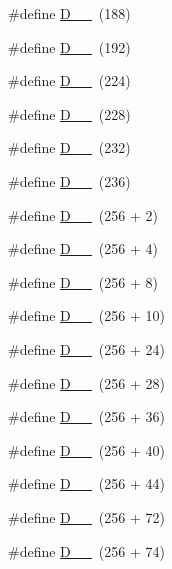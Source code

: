 \begin{DoxyCompactItemize}
\item 
\#define \hyperlink{group___d_r_i_v_e_r_s_gabe9d05e6c0b53d1452944c767ec4e39f}{D\+\_\+\_}~(188)
\item 
\#define \hyperlink{group___d_r_i_v_e_r_s_ga737381384143cf039503023e04037a26}{D\+\_\+\_}~(192)
\item 
\#define \hyperlink{group___d_r_i_v_e_r_s_gafd5baf97b37c848b12dec9b718d27188}{D\+\_\+\_}~(224)
\item 
\#define \hyperlink{group___d_r_i_v_e_r_s_ga87090eb84fc9a689a087e9f7e59cd4fb}{D\+\_\+\_}~(228)
\item 
\#define \hyperlink{group___d_r_i_v_e_r_s_gafd752a244bd3eb5e07f77712d9653197}{D\+\_\+\_}~(232)
\item 
\#define \hyperlink{group___d_r_i_v_e_r_s_ga9141d44a2f2636d23c001b5832118326}{D\+\_\+\_}~(236)
\item 
\#define \hyperlink{group___d_r_i_v_e_r_s_gab444dc9d9eaf98f46563cc87fcb965a4}{D\+\_\+\_}~(256 + 2)
\item 
\#define \hyperlink{group___d_r_i_v_e_r_s_ga83973bf9de6879524cca19f3332e707e}{D\+\_\+\_}~(256 + 4)
\item 
\#define \hyperlink{group___d_r_i_v_e_r_s_ga2f44fbe8696fcc34619d6e61916c22d0}{D\+\_\+\_}~(256 + 8)
\item 
\#define \hyperlink{group___d_r_i_v_e_r_s_ga6b208218857c2067078082e832148f61}{D\+\_\+\_}~(256 + 10)
\item 
\#define \hyperlink{group___d_r_i_v_e_r_s_gac84316958d525db0c89e1519e8af6637}{D\+\_\+\_}~(256 + 24)
\item 
\#define \hyperlink{group___d_r_i_v_e_r_s_ga2533cfdd19cb87a86667620a33a9d561}{D\+\_\+\_}~(256 + 28)
\item 
\#define \hyperlink{group___d_r_i_v_e_r_s_ga359aac18087bef8a3f044faf13952fa2}{D\+\_\+\_}~(256 + 36)
\item 
\#define \hyperlink{group___d_r_i_v_e_r_s_gae0dfa8b55558dff48604d4ac2c28fa9c}{D\+\_\+\_}~(256 + 40)
\item 
\#define \hyperlink{group___d_r_i_v_e_r_s_ga4fd075d6c0e817fbafca24af8305386e}{D\+\_\+\_}~(256 + 44)
\item 
\#define \hyperlink{group___d_r_i_v_e_r_s_ga065f93eacb4dcc7020cc21146e533110}{D\+\_\+\_}~(256 + 72)
\item 
\#define \hyperlink{group___d_r_i_v_e_r_s_gaadac9643410cb6abb08481bebc549d0d}{D\+\_\+\_}~(256 + 74)
\item 

\end{DoxyCompactItemize}
